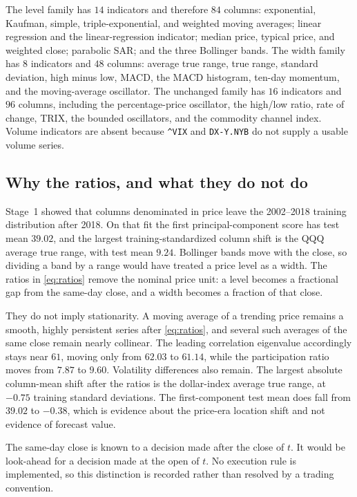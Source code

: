 \documentclass[11pt]{article}
\begin{document}
The level family has \(14\) indicators and therefore \(84\) columns: exponential, Kaufman, simple, triple-exponential, and weighted moving averages; linear regression and the linear-regression indicator; median price, typical price, and weighted close; parabolic SAR; and the three Bollinger bands.
The width family has \(8\) indicators and \(48\) columns: average true range, true range, standard deviation, high minus low, MACD, the MACD histogram, ten-day momentum, and the moving-average oscillator.
The unchanged family has \(16\) indicators and \(96\) columns, including the percentage-price oscillator, the high/low ratio, rate of change, TRIX, the bounded oscillators, and the commodity channel index.
Volume indicators are absent because \texttt{\^{}VIX} and \texttt{DX-Y.NYB} do not supply a usable volume series.

\subsection{Why the ratios, and what they do not do}

Stage~1 showed that columns denominated in price leave the 2002--2018 training distribution after 2018.
On that fit the first principal-component score has test mean \(39.02\), and the largest training-standardized column shift is the QQQ average true range, with test mean \(9.24\).
Bollinger bands move with the close, so dividing a band by a range would have treated a price level as a width.
The ratios in \eqref{eq:ratios} remove the nominal price unit: a level becomes a fractional gap from the same-day close, and a width becomes a fraction of that close.

They do not imply stationarity.
A moving average of a trending price remains a smooth, highly persistent series after \eqref{eq:ratios}, and several such averages of the same close remain nearly collinear.
The leading correlation eigenvalue accordingly stays near \(61\), moving only from \(62.03\) to \(61.14\), while the participation ratio moves from \(7.87\) to \(9.60\).
Volatility differences also remain.
The largest absolute column-mean shift after the ratios is the dollar-index average true range, at \(-0.75\) training standard deviations.
The first-component test mean does fall from \(39.02\) to \(-0.38\), which is evidence about the price-era location shift and not evidence of forecast value.

The same-day close is known to a decision made after the close of \(t\).
It would be look-ahead for a decision made at the open of \(t\).
No execution rule is implemented, so this distinction is recorded rather than resolved by a trading convention.
\end{document}

